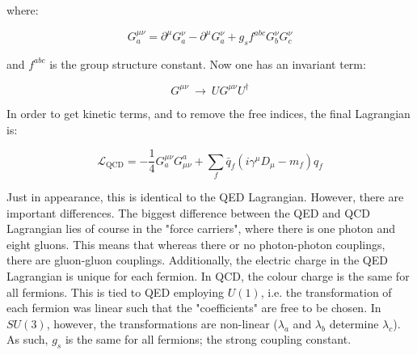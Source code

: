 \documentclass[11pt,a4paper]{article}
\begin{document}
where:

\begin{equation}
	G_a^{\mu\nu} = \partial^\mu G_a^\nu - \partial^\mu G_a^\nu + g_sf^{abc}G_b^\nu G_c^\nu
\end{equation}

and $f^{abc}$ is the group structure constant. Now one has an invariant term:

\begin{equation}
	G^{\mu\nu} \:\rightarrow\: UG^{\mu\nu}U^\dagger
\end{equation}

In order to get kinetic terms, and to remove the free indices, the final Lagrangian is:

\begin{equation}
	\mathcal{L}_{\text{QCD}} = -\frac{1}{4}G_a^{\mu\nu}G_{\mu\nu}^a + \sum_f \bar{q}_f(i\gamma^\mu D_\mu - m_f)q_f
\end{equation}

Just in appearance, this is identical to the QED Lagrangian. However, there are important differences. The biggest difference between the QED and QCD Lagrangian lies of course in the "force carriers", where there is one photon and eight gluons. This means that whereas there or no photon-photon couplings, there are gluon-gluon couplings. Additionally, the electric charge in the QED Lagrangian is unique for each fermion. In QCD, the colour charge is the same for all fermions. This is tied to QED employing $U(1)$, i.e. the transformation of each fermion was linear such that the "coefficients" are free to be chosen. In $SU(3)$, however, the transformations are non-linear ($\lambda_a$ and $\lambda_b$ determine $\lambda_c$). As such, $g_s$ is the same for all fermions; the strong coupling constant.
\end{document}
